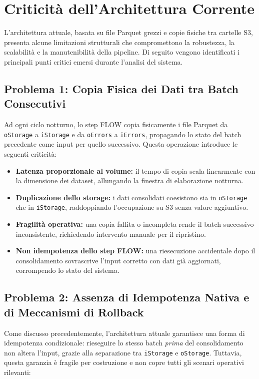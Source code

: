 \documentclass[12pt,a4paper,openright,twoside]{book}
\begin{document}
\section{Criticità dell’Architettura Corrente}
\label{sec:criticita-architettura}
L’architettura attuale, basata su file Parquet grezzi e copie fisiche tra cartelle S3, presenta alcune limitazioni strutturali che compromettono la robustezza, la scalabilità e la manutenibilità della pipeline. Di seguito vengono identificati i principali punti critici emersi durante l’analisi del sistema.

\subsection{Problema 1: Copia Fisica dei Dati tra Batch Consecutivi}
Ad ogni ciclo notturno, lo step FLOW copia fisicamente i file Parquet da \texttt{oStorage} a \texttt{iStorage} e da \texttt{oErrors} a \texttt{iErrors}, propagando lo stato del batch precedente come input per quello successivo.
Questa operazione introduce le seguenti criticità:

\begin{itemize}
    \item \textbf{Latenza proporzionale al volume:} il tempo di copia scala linearmente con la dimensione dei dataset, allungando la finestra di elaborazione notturna.
    \item \textbf{Duplicazione dello storage:} i dati consolidati coesistono sia in \texttt{oStorage} che in \texttt{iStorage}, raddoppiando l'occupazione su S3 senza valore aggiuntivo.
    \item \textbf{Fragilità operativa:} una copia fallita o incompleta rende il batch successivo inconsistente, richiedendo intervento manuale per il ripristino.
    \item \textbf{Non idempotenza dello step FLOW:} una riesecuzione accidentale dopo il consolidamento sovrascrive l'input corretto con dati già aggiornati, corrompendo lo stato del sistema.
\end{itemize}

\subsection{Problema 2: Assenza di Idempotenza Nativa e di Meccanismi di Rollback}
Come discusso precedentemente, l’architettura attuale garantisce una forma di idempotenza condizionale: rieseguire lo stesso batch \emph{prima} del consolidamento non altera l’input, grazie alla separazione tra \texttt{iStorage} e \texttt{oStorage}. 
Tuttavia, questa garanzia è fragile per costruzione e non copre tutti gli scenari operativi rilevanti:
\end{document}

